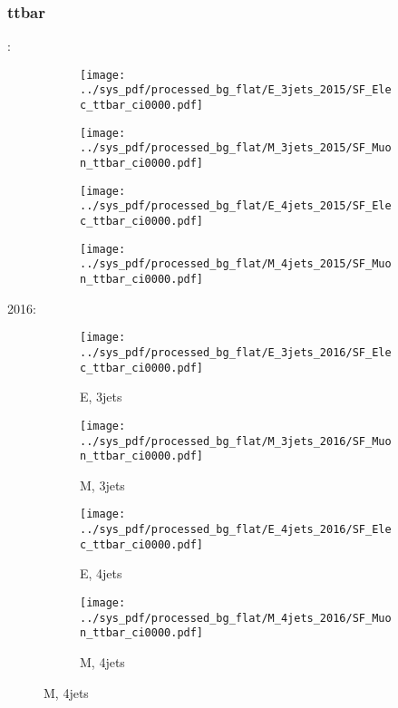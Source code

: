 \documentclass{beamer}
\begin{document}
\begin{frame}
\frametitle{ttbar}
\fontsize{5}{1}:
\begin{figure}
\centering
\begin{subfigure}[b]{0.24\textwidth}
\texttt{[image: ../sys\_pdf/processed\_bg\_flat/E\_3jets\_2015/SF\_Elec\_ttbar\_ci0000.pdf]}
\end{subfigure}
\begin{subfigure}[b]{0.24\textwidth}
\texttt{[image: ../sys\_pdf/processed\_bg\_flat/M\_3jets\_2015/SF\_Muon\_ttbar\_ci0000.pdf]}
\end{subfigure}
\begin{subfigure}[b]{0.24\textwidth}
\texttt{[image: ../sys\_pdf/processed\_bg\_flat/E\_4jets\_2015/SF\_Elec\_ttbar\_ci0000.pdf]}
\end{subfigure}
\begin{subfigure}[b]{0.24\textwidth}
\texttt{[image: ../sys\_pdf/processed\_bg\_flat/M\_4jets\_2015/SF\_Muon\_ttbar\_ci0000.pdf]}
\end{subfigure}
\end{figure}
2016:
\begin{figure}
\centering
\begin{subfigure}[b]{0.24\textwidth}
\texttt{[image: ../sys\_pdf/processed\_bg\_flat/E\_3jets\_2016/SF\_Elec\_ttbar\_ci0000.pdf]}
\captionsetup{font=tiny}
\caption{E, 3jets}
\end{subfigure}
\begin{subfigure}[b]{0.24\textwidth}
\texttt{[image: ../sys\_pdf/processed\_bg\_flat/M\_3jets\_2016/SF\_Muon\_ttbar\_ci0000.pdf]}
\captionsetup{font=tiny}
\caption{M, 3jets}
\end{subfigure}
\begin{subfigure}[b]{0.24\textwidth}
\texttt{[image: ../sys\_pdf/processed\_bg\_flat/E\_4jets\_2016/SF\_Elec\_ttbar\_ci0000.pdf]}
\captionsetup{font=tiny}
\caption{E, 4jets}
\end{subfigure}
\begin{subfigure}[b]{0.24\textwidth}
\texttt{[image: ../sys\_pdf/processed\_bg\_flat/M\_4jets\_2016/SF\_Muon\_ttbar\_ci0000.pdf]}
\captionsetup{font=tiny}
\caption{M, 4jets}
\end{subfigure}
\end{figure}
\end{frame}
\end{document}
